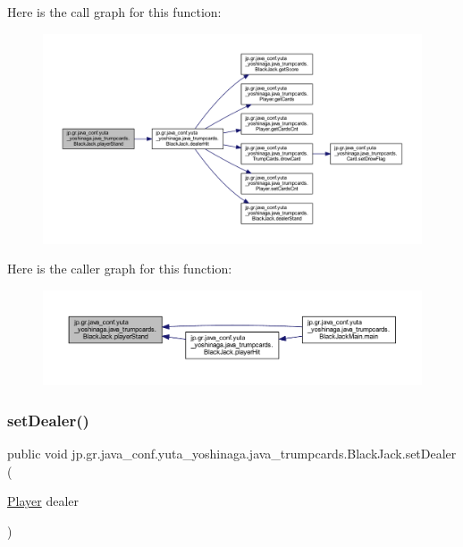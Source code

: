 Here is the call graph for this function\+:
\nopagebreak
\begin{figure}[H]
\begin{center}
\leavevmode
\includegraphics[width=350pt]{classjp_1_1gr_1_1java__conf_1_1yuta__yoshinaga_1_1java__trumpcards_1_1_black_jack_a53f37ae6f1388143c70a8b138c6c2443_cgraph}
\end{center}
\end{figure}
Here is the caller graph for this function\+:
\nopagebreak
\begin{figure}[H]
\begin{center}
\leavevmode
\includegraphics[width=350pt]{classjp_1_1gr_1_1java__conf_1_1yuta__yoshinaga_1_1java__trumpcards_1_1_black_jack_a53f37ae6f1388143c70a8b138c6c2443_icgraph}
\end{center}
\end{figure}
\mbox{\label{classjp_1_1gr_1_1java__conf_1_1yuta__yoshinaga_1_1java__trumpcards_1_1_black_jack_a8fd066f80b7dd83f393a770bb24cd675}} 
\subsubsection{\texorpdfstring{set\+Dealer()}{setDealer()}}
{\footnotesize\ttfamily public void jp.\+gr.\+java\+\_\+conf.\+yuta\+\_\+yoshinaga.\+java\+\_\+trumpcards.\+Black\+Jack.\+set\+Dealer (\begin{DoxyParamCaption}\item[{\hyperlink{classjp_1_1gr_1_1java__conf_1_1yuta__yoshinaga_1_1java__trumpcards_1_1_player}{Player}}]{dealer }\end{DoxyParamCaption})}



